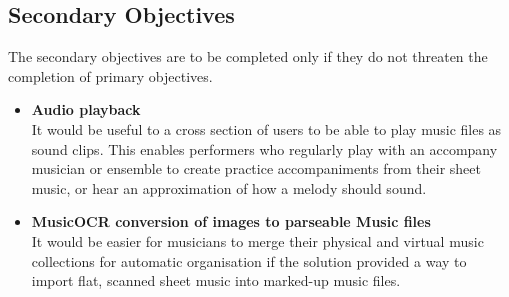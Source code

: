 \subsection{Secondary Objectives}
The secondary objectives are to be completed only if they do not threaten the completion of primary objectives.

\begin{itemize}
    \item \textbf{Audio playback}\\
    It would be useful to a cross section of users to be able to play music files as sound clips. This enables performers who regularly play with an accompany musician or ensemble to create practice accompaniments from their sheet music, or hear an approximation of how a melody should sound.
    \item \textbf{MusicOCR conversion of images to parseable Music files}\\
It would be easier for musicians to merge their physical and virtual music collections for automatic organisation if the solution provided a way to import flat, scanned sheet music into marked-up music files. 
\end{itemize}
